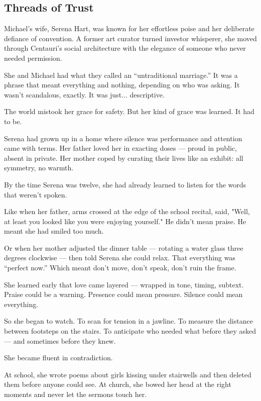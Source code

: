\subsection{Threads of Trust}

Michael’s wife, Serena Hart, was known for her effortless poise and her deliberate defiance of convention.
A former art curator turned investor whisperer, she moved through Centauri’s social architecture with the elegance of someone who never needed permission.

She and Michael had what they called an ``untraditional marriage.'' 
It was a phrase that meant everything and nothing, depending on who was asking.
It wasn’t scandalous, exactly.
It was just... descriptive.

The world mistook her grace for safety.
But her kind of grace was learned.
It had to be.

Serena had grown up in a home where silence was performance and attention came with terms.
Her father loved her in exacting doses — proud in public, absent in private.
Her mother coped by curating their lives like an exhibit: all symmetry, no warmth.

By the time Serena was twelve, she had already learned to listen for the words that weren’t spoken.

Like when her father, arms crossed at the edge of the school recital, said,
"Well, at least you looked like you were enjoying yourself."
He didn’t mean praise. He meant she had smiled too much.

Or when her mother adjusted the dinner table — rotating a water glass three degrees clockwise —
then told Serena she could relax. That everything was “perfect now.”
Which meant don’t move, don’t speak, don’t ruin the frame.

She learned early that love came layered — wrapped in tone, timing, subtext.
Praise could be a warning. Presence could mean pressure.
Silence could mean everything.

So she began to watch.
To scan for tension in a jawline.
To measure the distance between footsteps on the stairs.
To anticipate who needed what before they asked — and sometimes before they knew.

She became fluent in contradiction.

At school, she wrote poems about girls kissing under stairwells and then deleted them before anyone could see.
At church, she bowed her head at the right moments and never let the sermons touch her.

